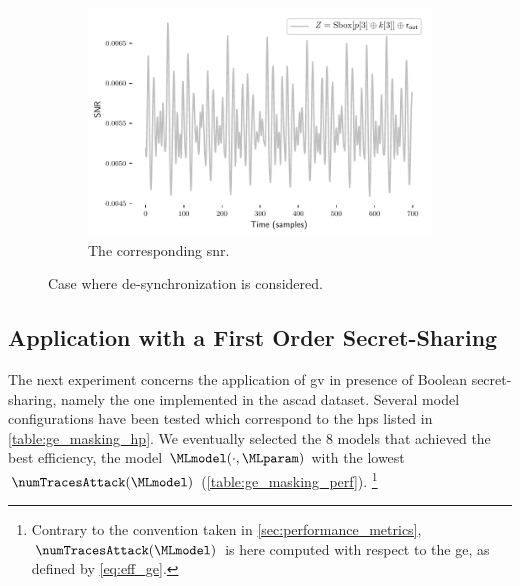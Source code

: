\begin{figure}
\begin{subfigure}[]{0.49 \textwidth}
    \end{subfigure}
    \begin{subfigure}[]{0.49 \textwidth}
        \includegraphics[width=\textwidth]{figures/ASCAD_700/snr_desync100}
        \caption{The corresponding \gls{snr}.}
        \label{fig:no_mask_with_desynchro_snr}
    \end{subfigure}
	\caption{Case where de-synchronization is considered.}
	\label{fig:no_mask_with_desynchro}
\end{figure}

\subsection{Application with a First Order Secret-Sharing}
\label{sec:with_mask_no_desynchro}
The next experiment concerns the application of \gls{gv} in presence of Boolean secret-sharing, namely the one implemented in the \gls{ascad} dataset.
Several model configurations have been tested which correspond to the \glspl{hp} listed in \autoref{table:ge_masking_hp}.
We eventually selected the \(8\) models that achieved the best efficiency, \ie{} the model \(\MLmodel(\cdot, \MLparam)\) with the lowest \(\numTracesAttack(\MLmodel)\) (\autoref{table:ge_masking_perf}).%
\footnote{
    Contrary to the convention taken in \autoref{sec:performance_metrics}, \(\numTracesAttack(\MLmodel)\) is here computed with respect to the \gls{ge}, as defined by \autoref{eq:eff_ge}.
}
 
